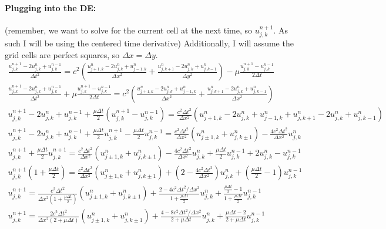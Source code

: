 \documentclass{article}
\begin{document}
\paragraph{Plugging into the DE:} (remember, we want to solve for the current cell at the next time, so $u_{j,k}^{n+1}$.  As such I will be using the centered time derivative)  Additionally, I will assume the grid cells are perfect squares, so $\Delta x = \Delta y$.
$$
\begin{aligned}
	\frac{u_{j, k}^{n+1} - 2u_{j,k}^n + u_{j,k}^{n-1}}{{\Delta t}^2} = c^2 \left(\frac{u_{j+1, k}^n - 2u_{j,k}^n + u_{j-1,k}^n}{{\Delta x}^2} + \frac{u_{j, k+1}^n - 2u_{j,k}^n + u_{j,k-1}^n}{{\Delta y}^2} \right) - \mu \frac{u_{j,k}^{n+1} - u_{j, k}^{n-1}}{2 \Delta t} \\
	\frac{u_{j, k}^{n+1} - 2u_{j,k}^n + u_{j,k}^{n-1}}{{\Delta t}^2} + \mu \frac{u_{j,k}^{n+1} - u_{j, k}^{n-1}}{2 \Delta t} = c^2 \left(\frac{u_{j+1, k}^n - 2u_{j,k}^n + u_{j-1,k}^n}{{\Delta x}^2} + \frac{u_{j, k+1}^n - 2u_{j,k}^n + u_{j,k-1}^n}{{\Delta x}^2} \right) \\
	u_{j, k}^{n+1} - 2u_{j,k}^n + u_{j,k}^{n-1} + \frac{\mu \Delta t}{2} (u_{j,k}^{n+1} - u_{j, k}^{n-1}) = \frac{c^2 \Delta t^2}{\Delta x^2} \left(u_{j+1, k}^n - 2u_{j,k}^n + u_{j-1,k}^n + u_{j, k+1}^n - 2u_{j,k}^n + u_{j,k-1}^n \right) \\
	u_{j, k}^{n+1} - 2u_{j,k}^n + u_{j,k}^{n-1} + \frac{\mu \Delta t}{2} u_{j,k}^{n+1} - \frac{\mu \Delta t}{2} u_{j, k}^{n-1} = \frac{c^2 \Delta t^2}{\Delta x^2} \left(u_{j \pm 1, k}^n + u_{j, k \pm 1}^n \right) - \frac{4 c^2 \Delta t^2}{\Delta x^2} u_{j,k}^n \\
	u_{j, k}^{n+1} + \frac{\mu \Delta t}{2} u_{j,k}^{n+1} = \frac{c^2 \Delta t^2}{\Delta x^2} \left(u_{j \pm 1, k}^n + u_{j, k \pm 1}^n \right) - \frac{4 c^2 \Delta t^2}{\Delta x^2} u_{j,k}^n + \frac{\mu \Delta t}{2} u_{j, k}^{n-1} + 2u_{j,k}^n - u_{j,k}^{n-1} \\
	u_{j, k}^{n+1} (1 + \frac{\mu \Delta t}{2}) = \frac{c^2 \Delta t^2}{\Delta x^2} \left(u_{j \pm 1, k}^n + u_{j, k \pm 1}^n \right) + (2-\frac{4 c^2 \Delta t^2}{\Delta x^2}) u_{j,k}^n + (\frac{\mu \Delta t}{2} - 1) u_{j, k}^{n-1} \\
	u_{j, k}^{n+1} = \frac{c^2 \Delta t^2}{\Delta x^2 (1 + \frac{\mu \Delta t}{2})} \left(u_{j \pm 1, k}^n + u_{j, k \pm 1}^n \right) + \frac{2- 4 c^2 \Delta t^2 / \Delta x^2}{1 + \frac{\mu \Delta t}{2}} u_{j,k}^n + \frac{\frac{\mu \Delta t}{2} - 1}{1 + \frac{\mu \Delta t}{2}} u_{j, k}^{n-1} \\
	u_{j, k}^{n+1} = \frac{2 c^2 \Delta t^2}{\Delta x^2 (2 + \mu \Delta t)} \left(u_{j \pm 1, k}^n + u_{j, k \pm 1}^n \right) + \frac{4- 8 c^2 \Delta t^2 / \Delta x^2}{2 + \mu \Delta t} u_{j,k}^n + \frac{\mu \Delta t - 2}{2 + \mu \Delta t} u_{j, k}^{n-1} \\
\end{aligned}
$$
\end{document}
